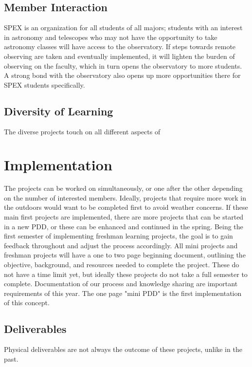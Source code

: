 \documentclass[conference]{IEEEtran} %
\begin{document}
\subsection{Member Interaction}
\label{subsec:plug-n-play}
SPEX is an organization for all students of all majors; students with an interest in astronomy and telescopes who may not have the opportunity to take astronomy classes will have access to the observatory. If steps towards remote observing are taken and eventually implemented, it will lighten the burden of observing on the faculty, which in turn opens the observatory to more students. A strong bond with the observatory also opens up more opportunities there for SPEX students specifically. 

\subsection{Diversity of Learning}
\label{subsec:diverse}

The diverse projects touch on all different aspects of 


\section{Implementation}
\label{sec:implementation}

The projects can be worked on simultaneously, or one after the other depending on the number of interested members. Ideally, projects that require more work in the outdoors would want to be completed first to avoid weather concerns. If these main first projects are implemented, there are more projects that can be started in a new PDD, or these can be enhanced and continued in the spring. Being the first semester of implementing freshman learning projects, the goal is to gain feedback throughout and adjust the process accordingly. All mini projects and freshman projects will have a one to two page beginning document, outlining the objective, background, and resources needed to complete the project. These do not have a time limit yet, but ideally these projects do not take a full semester to complete. Documentation of our process and knowledge sharing are important requirements of this year. The one page "mini PDD" is the first implementation of this concept.



\subsection{Deliverables}
\label{subsec:deliverables}
Physical deliverables are not always the outcome of these projects, unlike in the past. 
\end{document}
